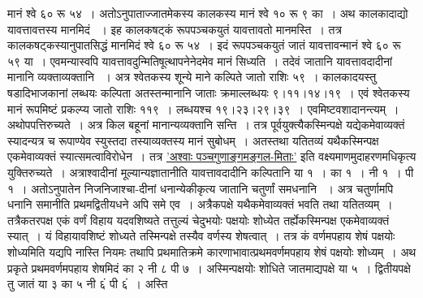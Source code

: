 \documentclass[11pt, openany]{book}
\begin{document}
\begin{sloppypar}
\noindent मानं श्वे ६० रू ५४~। अतोऽनुपाताज्जातमेकस्य कालकस्य मानं श्वे १० रू ९ का~। अथ कालकादाद्यो यावत्तावत्तस्य मानमिदं ~। इह कालकषट्कं रूपपञ्चकयुतं यावत्तावतो मानमस्ति~। तत्र कालकषट्कस्यानुपातसिद्धं मानमिदं श्वे ६० रू ५४~। इदं रूपपञ्चकयुतं जातं यावत्तावन्मानं श्वे ६० रू ५९ या~। एवमन्यास्वपि यावत्तावदुन्मितिषूत्थापनेनेदमेव मानं सिध्यति~। तदेवं जातानि यावत्तावदादीनां मानानि व्यक्ताव्यक्तानि ~। अत्र श्वेतकस्य शून्ये माने कल्पिते जातो राशिः ५९~। कालकादयस्तु षडादिभाजकानां लब्धयः कल्पिता अतस्तन्मानानि जाताः क्रमाल्लब्धयः ९।११।१४।१९~। एवं श्वेतकस्य मानं रूपमिष्टं प्रकल्प्य जातो राशिः ११९~। लब्धयश्च १९।२३।२९।३९~। एवमिष्टवशादानन्त्यम्~। अथोपपत्तिरुच्यते~। अत्र किल बहूनां मानान्यव्यक्तानि सन्ति~। तत्र पूर्वयुक्त्यैकस्मिन्पक्षे यद्येकमेवाव्यक्तं स्यादन्यत्र च रूपाण्येव स्युस्तदा तस्याव्यक्तस्य मानं सुबोधम्~। अतस्तथा यतितव्यं यथैकस्मिन्पक्ष एकमेवाव्यक्तं स्यात्समत्वाविरोधेन~। तत्र \hyperref[9.137]{'अश्वाः पञ्चगुणाङ्गमङ्गल-मिताः'} इति वक्ष्यमाणमुदाहरणमधिकृत्य युक्तिरुच्यते~। अत्राश्वादीनां मूल्यान्यज्ञातानीति यावत्तावदादीनि कल्पितानि या १~। का १~। नी १~। पी १~। अतोऽनुपातेन निजनिजाश्चा-दीनां धनान्येकीकृत्य जातानि चतुर्णां समधनानि ~। अत्र चतुर्णामपि धनानि समानीति प्रथमद्वितीयधने अपि समे एव~। अत्रैकपक्षे यथैकमेवाव्यक्तं भवति तथा यतितव्यम्~। तत्रैकतरपक्ष एकं वर्णं विहाय यदवशिष्यते तत्तुल्यं चेदुभयोः पक्षयोः शोध्येत तर्ह्येकस्मिन्पक्ष एकमेवाव्यक्तं स्यात्~। यं विहायावशिष्टं शोध्यते तस्मिन्पक्षे तस्यैव वर्णस्य शेषत्वात्~। तत्र कं वर्णमपहाय शेषं पक्षयोः शोध्यमिति यद्यपि नास्ति नियमः तथापि प्रथमातिक्रमे कारणाभावात्प्रथमवर्णमपहाय शेषं पक्षयोः शोध्यम्~। अथ प्रकृते प्रथमवर्णमपहाय शेषमिदं का २ नी ८ पी ७~। अस्मिन्पक्षयोः शोधिते जातमाद्यपक्षे या ५~। द्वितीयपक्षे तु जातं या ३ का ५ नी ६ं पी ६ं~। अस्ति
\end{sloppypar}
\end{document}

